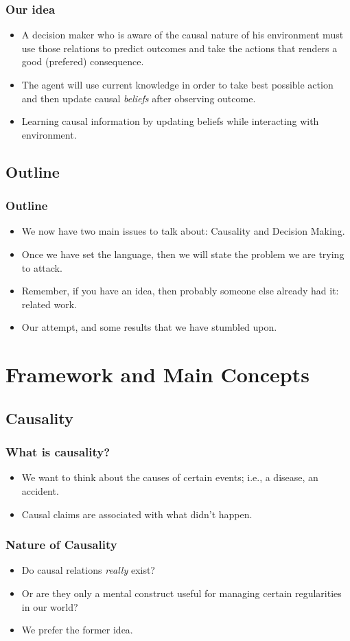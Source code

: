 \documentclass{beamer}
\theoremstyle{plain}
\begin{document}
\begin{frame}
\frametitle{Our idea}
\begin{itemize}
\item A decision maker who is aware of the causal nature of his environment must use those relations to predict outcomes and take the actions that renders a good (prefered) consequence. 
\item The agent will use current knowledge in order to take best possible action and then update causal \textit{beliefs} after observing outcome.
\item Learning causal information by updating beliefs while interacting with environment.
\end{itemize}
\end{frame}

\subsection{Outline}
\begin{frame}
\frametitle{Outline}
\begin{itemize}
\item We now have two main issues to talk about: Causality and Decision Making. 
\item Once we have set the language, then we will state the problem we are trying to attack.
\item Remember, if you have an idea, then probably someone else already had it: related work.
\item Our attempt, and some results that we have stumbled upon. 
\end{itemize}
\end{frame}

\section{Framework and Main Concepts}
	\subsection{Causality}
	\begin{frame}
		\frametitle{What is causality?}
		\begin{itemize}
		\item We want to think about the causes of certain events; i.e., a disease, an accident. 
		\item Causal claims are associated with what didn't happen. 
		\end{itemize}
	\end{frame}
		\begin{frame}
		\frametitle{Nature of Causality}
		\begin{itemize}
		\item Do causal relations \textit{really} exist? 
		\item Or are they only a mental construct useful for managing certain regularities in our world?
		\item We prefer the former idea. 
		\end{itemize}
		\end{frame}				
		
\end{document}
